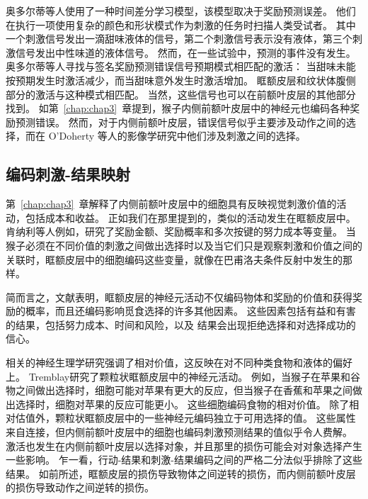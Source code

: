 奥多尔蒂等人\cite{o2003temporal}使用了一种时间差分学习模型，该模型取决于奖励预测误差。
他们在执行一项使用复杂的颜色和形状模式作为刺激的任务时扫描人类受试者。
其中一个刺激信号发出一滴甜味液体的信号，第二个刺激信号表示没有液体，第三个刺激信号发出中性味道的液体信号。
然而，在一些试验中，预测的事件没有发生。
奥多尔蒂等人寻找与签名奖励预测错误信号预期模式相匹配的激活：
当甜味未能按预期发生时激活减少，而当甜味意外发生时激活增加。
眶额皮层和纹状体腹侧部分的激活与这种模式相匹配。
当然，这些信号也可以在前额叶皮层的其他部分找到。
如第~\ref{chap:chap3}~章提到，猴子内侧前额叶皮层中的神经元也编码各种奖励预测错误\cite{matsumoto2007medial,seo2007temporal,hayden2011surprise}。
然而，对于内侧前额叶皮层，错误信号似乎主要涉及动作之间的选择，而在 O'Doherty 等人\cite{o2003temporal}的影像学研究中他们涉及刺激之间的选择。\par



\subsection{编码刺激-结果映射}

第~\ref{chap:chap3}~章解释了内侧前额叶皮层中的细胞具有反映视觉刺激价值的活动，包括成本和收益。
正如我们在那里提到的，类似的活动发生在眶额皮层中。 
肯纳利等人\cite{kennerley2009evaluating}例如，研究了奖励金额、奖励概率和多次按键的努力成本等变量。
当猴子必须在不同价值的刺激之间做出选择时\cite{seo2008cortical}以及当它们只是观察刺激和价值之间的关联时，眶额皮层中的细胞编码这些变量，就像在巴甫洛夫条件反射中发生的那样\cite{morrison2009convergence}。\par


简而言之，文献表明，眶额皮层的神经元活动不仅编码物体和奖励的价值\cite{padoa2006neurons}和获得奖励的概率\cite{kennerley2009evaluating}，而且还编码影响觅食选择的许多其他因素。
这些因素包括有益和有害的结果\cite{morrison2009convergence}，包括努力成本\cite{kennerley2009evaluating}、时间\cite{roesch2005neuronal}和风险\cite{o2010coding}，以及 结果会出现拒绝选择\cite{abe2011distributed}和对选择成功的信心\cite{kepecs2008neural}。\par


相关的神经生理学研究强调了相对价值，这反映在对不同种类食物和液体的偏好上。
Tremblay\cite{tremblay1999relative}研究了颗粒状眶额皮层中的神经元活动。
例如，当猴子在苹果和谷物之间做出选择时，细胞可能对苹果有更大的反应，但当猴子在香蕉和苹果之间做出选择时，细胞对苹果的反应可能更小。
这些细胞编码食物的相对价值。
除了相对估值外，颗粒状眶额皮层中的一些神经元编码独立于可用选择的值\cite{padoa2009range}。
这些属性来自连接，但内侧前额叶皮层中的细胞也编码刺激预测结果的值似乎令人费解\cite{kennerley2009evaluating}。
激活也发生在内侧前额叶皮层以选择对象\cite{behrens2007learning,glascher2009determining}，并且那里的损伤可能会对对象选择产生一些影响\cite{camille2011double}。
乍一看，行动-结果和刺激-结果编码之间的严格二分法似乎排除了这些结果。
如前所述，眶额皮层的损伤导致物体之间逆转的损伤\cite{rudebeck2006separate}，而内侧前额叶皮层的损伤导致动作之间逆转的损伤\cite{kennerley2006optimal}。\par


